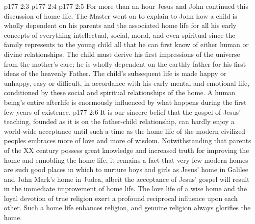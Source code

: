 \vs p177 2:3 
\vs p177 2:4 
\vs p177 2:5 For more than an hour Jesus and John continued this discussion of home life. The Master went on to explain to John how a child is wholly dependent on his parents and the associated home life for all his early concepts of everything intellectual, social, moral, and even spiritual since the family represents to the young child all that he can first know of either human or divine relationships. The child must derive his first impressions of the universe from the mother’s care; he is wholly dependent on the earthly father for his first ideas of the heavenly Father. The child’s subsequent life is made happy or unhappy, easy or difficult, in accordance with his early mental and emotional life, conditioned by these social and spiritual relationships of the home. A human being’s entire afterlife is enormously influenced by what happens during the first few years of existence.
\vs p177 2:6 \pc It is our sincere belief that the gospel of Jesus’ teaching, founded as it is on the father\hyp{}child relationship, can hardly enjoy a world\hyp{}wide acceptance until such a time as the home life of the modern civilized peoples embraces more of love and more of wisdom. Notwithstanding that parents of the XX century possess great knowledge and increased truth for improving the home and ennobling the home life, it remains a fact that very few modern homes are such good places in which to nurture boys and girls as Jesus’ home in Galilee and John Mark’s home in Judea, albeit the acceptance of Jesus’ gospel will result in the immediate improvement of home life. The love life of a wise home and the loyal devotion of true religion exert a profound reciprocal influence upon each other. Such a home life enhances religion, and genuine religion always glorifies the home.
